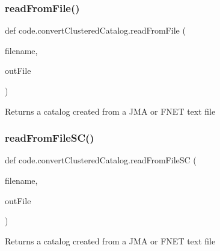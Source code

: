 \subsubsection{\texorpdfstring{read\+From\+File()}{readFromFile()}}
{\footnotesize\ttfamily def code.\+convert\+Clustered\+Catalog.\+read\+From\+File (\begin{DoxyParamCaption}\item[{}]{filename,  }\item[{}]{out\+File }\end{DoxyParamCaption})}

\begin{DoxyVerb}Returns a catalog created from a JMA or FNET text file
\end{DoxyVerb}
 \mbox{\label{namespacecode_1_1convert_clustered_catalog_aa6c67a730c50e4bb9316fa4d986abd06}} 
\subsubsection{\texorpdfstring{read\+From\+File\+S\+C()}{readFromFileSC()}}
{\footnotesize\ttfamily def code.\+convert\+Clustered\+Catalog.\+read\+From\+File\+SC (\begin{DoxyParamCaption}\item[{}]{filename,  }\item[{}]{out\+File }\end{DoxyParamCaption})}

\begin{DoxyVerb}Returns a catalog created from a JMA or FNET text file
\end{DoxyVerb}
 